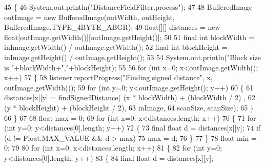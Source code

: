 \begin{DoxyCode}
45     \{
46         System.out.println(\textcolor{stringliteral}{"DistanceFieldFilter.process"});
47         
48         BufferedImage outImage = \textcolor{keyword}{new} BufferedImage(outWidth, outHeight, BufferedImage.TYPE\_4BYTE\_ABGR);
49         \textcolor{keywordtype}{float}[][] distances = \textcolor{keyword}{new} \textcolor{keywordtype}{float}[outImage.getWidth()][outImage.getHeight()];
50         
51         \textcolor{keyword}{final} \textcolor{keywordtype}{int} blockWidth = inImage.getWidth() / outImage.getWidth();
52         \textcolor{keyword}{final} \textcolor{keywordtype}{int} blockHeight = inImage.getHeight() / outImage.getHeight();
53         
54         System.out.println(\textcolor{stringliteral}{"Block size is "}+blockWidth+\textcolor{stringliteral}{","}+blockHeight);
55         
56         \textcolor{keywordflow}{for} (\textcolor{keywordtype}{int} x=0; x<outImage.getWidth(); x++)
57         \{
58             listener.reportProgress(\textcolor{stringliteral}{"Finding signed distance"}, x, outImage.getWidth());
59             \textcolor{keywordflow}{for} (\textcolor{keywordtype}{int} y=0; y<outImage.getHeight(); y++)
60             \{
61                 distances[x][y] = \mbox{\hyperlink{classorg_1_1newdawn_1_1slick_1_1tools_1_1hiero_1_1distancemap_1_1_distance_field_filter_a1db145606e5aad5d9d2007a8fe07a19d}{findSignedDistance}}( (x * blockWidth) + (blockWidth / 2)
      ,
62                                                       (y * blockHeight) + (blockHeight / 2),
63                                                       inImage,
64                                                       scanSize, scanSize);
65             \}
66         \}
67         
68         \textcolor{keywordtype}{float} max = 0;
69         \textcolor{keywordflow}{for} (\textcolor{keywordtype}{int} x=0; x<distances.length; x++)
70         \{
71             \textcolor{keywordflow}{for} (\textcolor{keywordtype}{int} y=0; y<distances[0].length; y++)
72             \{
73                 \textcolor{keyword}{final} \textcolor{keywordtype}{float} d = distances[x][y];
74                 \textcolor{keywordflow}{if} (d != Float.MAX\_VALUE && d > max)
75                     max = d;
76             \}
77         \}
78         \textcolor{keywordtype}{float} min = 0;
79         
80         \textcolor{keywordflow}{for} (\textcolor{keywordtype}{int} x=0; x<distances.length; x++)
81         \{
82             \textcolor{keywordflow}{for} (\textcolor{keywordtype}{int} y=0; y<distances[0].length; y++)
83             \{
84                 \textcolor{keyword}{final} \textcolor{keywordtype}{float} d = distances[x][y];

\end{DoxyCode}
